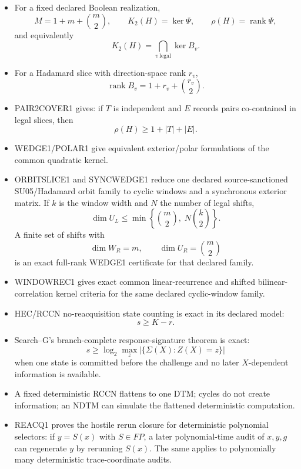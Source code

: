 \documentclass[11pt]{article}
\begin{document}
\begin{itemize}
\item For a fixed declared Boolean realization,
\[
M=1+m+\binom m2,\qquad
K_2(H)=\ker\Psi,\qquad
\rho(H)=\operatorname{rank}\Psi,
\]
and equivalently
\[
K_2(H)=\bigcap_{v\ \mathrm{legal}}\ker B_v.
\]

\item For a Hadamard slice with direction-space rank \(r_v\),
\[
\operatorname{rank}B_v=1+r_v+\binom{r_v}{2}.
\]

\item PAIR2COVER1 gives: if \(T\) is independent and \(E\) records pairs co-contained in legal
slices, then
\[
\rho(H)\ge 1+|T|+|E|.
\]

\item WEDGE1/POLAR1 give equivalent exterior/polar formulations of the common quadratic kernel.

\item ORBITSLICE1 and SYNCWEDGE1 reduce one declared source-sanctioned SU05/Hadamard orbit family to
cyclic windows and a synchronous exterior matrix. If \(k\) is the window width and \(N\) the
number of legal shifts,
\[
\dim U_L\le \min\!\left\{\binom m2,\;N\binom k2\right\}.
\]
A finite set of shifts with
\[
\dim W_R=m,\qquad \dim U_R=\binom m2
\]
is an exact full-rank WEDGE1 certificate for that declared family.

\item WINDOWREC1 gives exact common linear-recurrence and shifted bilinear-correlation kernel
criteria for the same declared cyclic-window family.

\item HEC/RCCN no-reacquisition state counting is exact in its declared model:
\[
s\ge K-r.
\]

\item Search--G's branch-complete response-signature theorem is exact:
\[
s\ge
\log_2\max_z
\left|\{\Sigma(X):Z(X)=z\}\right|
\]
when one state is committed before the challenge and no later \(X\)-dependent information is
available.

\item A fixed deterministic RCCN flattens to one DTM; cycles do not create information; an NDTM can
simulate the flattened deterministic computation.

\item REACQ1 proves the hostile rerun closure for deterministic polynomial selectors: if
\(y=S(x)\) with \(S\in FP\), a later polynomial-time audit of \(x,y,g\) can regenerate \(y\) by
rerunning \(S(x)\). The same applies to polynomially many deterministic trace-coordinate audits.


\end{itemize}
\end{document}
